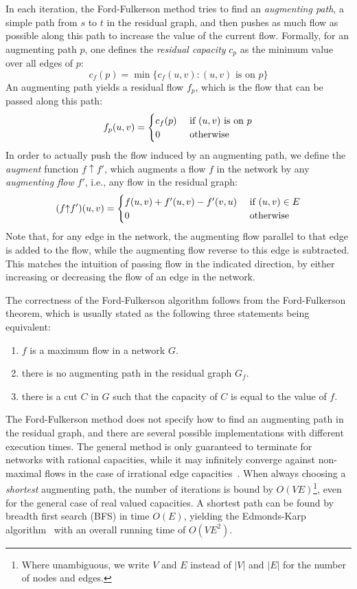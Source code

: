 \documentclass{llncs}
\begin{document}
In each iteration, the Ford-Fulkerson method tries to find an \emph{augmenting path}, \ie a simple path from $s$ to $t$ in the residual graph, and then 
pushes as much flow as possible along this path to increase the value of the current flow. 
Formally, for an augmenting path $p$, one defines the \emph{residual capacity} $c_p$ as the minimum value over all edges of $p$:
\[c_f(p) = \min \{c_f(u, v): \text{$(u, v)$ is on  $p$}\}\]
An augmenting path yields a residual flow $f_p$, which is the flow that can be passed along this path:
\[ f_p (u, v) = 
  \begin{cases}
  c_f(p) \hfill & \text{ if $(u, v)$ is on $p$} \\  
  0 \hfill & \text{ otherwise} \\
  \end{cases} 
\]
\newcommand{\augment}{{\mathbin\uparrow}}
In order to actually push the flow induced by an augmenting path, we define the \emph{augment} function $f\augment f'$, which augments a flow $f$ in the network 
by any \emph{augmenting flow} $f'$, i.e., any flow in the residual graph:
\[ (f \augment f') (u, v) = 
  \begin{cases}
  f (u, v) + f'(u, v) - f'(v, u) \hfill & \text{ if $(u, v) \in E$} \\  
  0 \hfill & \text{ otherwise} \\
  \end{cases} 
\]
Note that, for any edge in the network, the augmenting flow parallel to that edge is added to the flow, while the augmenting flow reverse to this edge is subtracted. 
This matches the intuition of passing flow in the indicated direction, by either increasing or decreasing the flow of an edge in the network.

The correctness of the Ford-Fulkerson algorithm follows from the Ford-Fulkerson theorem, which is usually stated as the following three statements being equivalent:
\begin{enumerate}
\item $f$ is a maximum flow in a network $G$.
\item there is no augmenting path in the residual graph $G_f$.
\item there is a cut $C$ in $G$ such that the capacity of $C$ is equal to the value of $f$.
\end{enumerate}

The Ford-Fulkerson method does not specify how to find an augmenting path in the residual graph, and there are several possible implementations with different execution times. The general method is only guaranteed to terminate for networks with rational capacities, while it may infinitely converge against non-maximal flows in the case of irrational edge capacities~\cite{FF56,Zwick95}. When always choosing a \emph{shortest} augmenting path, the number of iterations is bound by $O(VE)$\footnote{Where unambiguous, we write $V$ and $E$ instead of $|V|$ and $|E|$ for the number of nodes and edges.}, even for the general case of real valued capacities. A shortest path can be found by breadth first search (BFS) in time $O(E)$, yielding the Edmonds-Karp algorithm~\cite{EK72} with an overall running time of $O(VE^2)$. 
\end{document}
